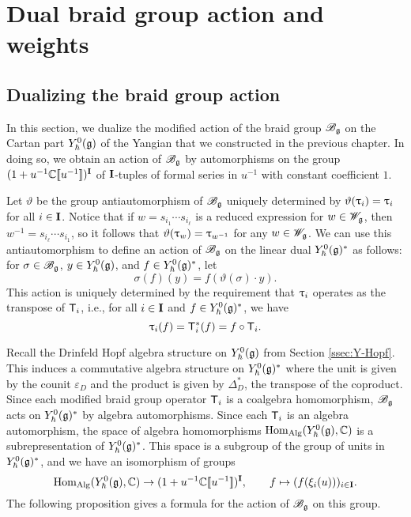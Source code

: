 \chapter{Dual braid group action and weights}\label{chap:weights}

\section{Dualizing the braid group action}

In this section, we dualize the modified action of the braid group $\Bg$ on the Cartan part $\Yhg[0]$ of the Yangian that we constructed in the previous chapter.
In doing so, we obtain an action of $\Bg$ by automorphisms on the group $(1+u^{-1}\C\db{u^{-1}})^\I$ of $\I$-tuples of formal series in $u^{-1}$ with constant coefficient $1$.

Let $\vartheta$ be the group antiautomorphism of $\Bg$ uniquely determined by $\vartheta(\braid_i)=\braid_i$ for all $i\in\I$.
Notice that if $w = s_{i_1}\cdots s_{i_\ell}$ is a reduced expression for $w\in\Wg$, then $w^{-1} = s_{i_\ell}\cdots s_{i_1}$, so it follows that $\vartheta(\braid_w)=\braid_{w^{-1}}$ for any $w\in\Wg$.
We can use this antiautomorphism to define an action of $\Bg$ on the linear dual $\Yhg[0]^*$ as follows: for $\sigma\in\Bg$, $y\in\Yhg[0]$, and $f\in\Yhg[0]^*$, let
\[\sigma(f)(y) = f(\vartheta(\sigma)\cdot y).\]
This action is uniquely determined by the requirement that $\braid_i$ operates as the transpose of $\mbraid_i$, i.e., for all $i\in\I$ and $f\in\Yhg[0]^*$, we have
\[\braid_i(f) = \mbraid_i^*(f) = f\circ\mbraid_i.\]

Recall the Drinfeld Hopf algebra structure on $\Yhg[0]$ from Section \ref{ssec:Y-Hopf}.
This induces a commutative algebra structure on $\Yhg[0]^*$ where the unit is given by the counit $\varepsilon_D$ and the product is given by $\Delta_D^*$, the transpose of the coproduct.
Since each modified braid group operator $\mbraid_i$ is a coalgebra homomorphism, $\Bg$ acts on $\Yhg[0]^*$ by algebra automorphisms.
Since each $\mbraid_i$ is an algebra automorphism, the space of algebra homomorphisms $\Hom_{\text{Alg}}(\Yhg[0],\C)$ is a subrepresentation of $\Yhg[0]^*$.
This space is a subgroup of the group of units in $\Yhg[0]^*$, and we have an isomorphism of groups
\[\Hom_{\text{Alg}}(\Yhg[0],\C)\to(1+u^{-1}\C\db{u^{-1}})^\I, \qquad f\mapsto(f(\xi_i(u)))_{i\in\I}.\]
The following proposition gives a formula for the action of $\Bg$ on this group.

